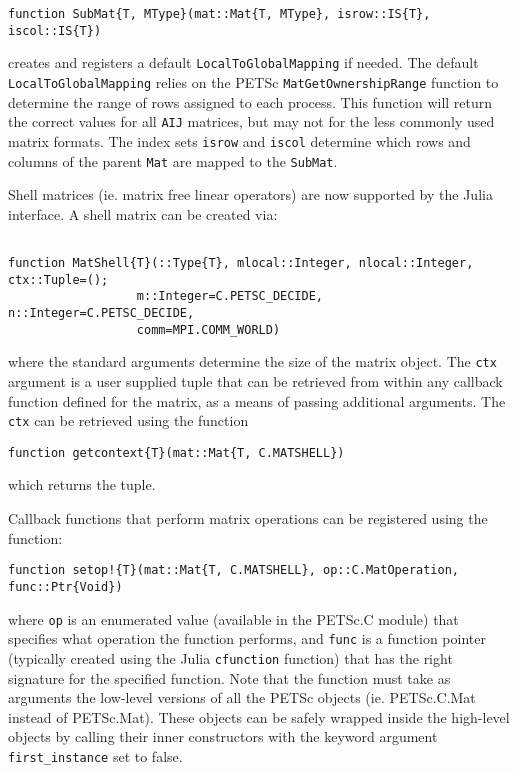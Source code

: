 \documentclass{article}
\begin{document}
\begin{verbatim}
function SubMat{T, MType}(mat::Mat{T, MType}, isrow::IS{T}, iscol::IS{T})
\end{verbatim}

\noindent creates and registers a default \texttt{LocalToGlobalMapping} if needed.  
The default \texttt{LocalToGlobalMapping} relies on the PETSc 
\texttt{MatGetOwnershipRange} function to determine the range of rows
assigned to each process.  This function will return the correct values for all 
\texttt{AIJ} matrices, but may not for the less commonly used matrix formats.
The index sets \texttt{isrow} and \texttt{iscol} determine which rows and
columns of the parent \texttt{Mat} are mapped to the \texttt{SubMat}.

Shell matrices (ie. matrix free linear operators) are now supported by the 
Julia interface.  A shell matrix can be created via:

\begin{verbatim}

function MatShell{T}(::Type{T}, mlocal::Integer, nlocal::Integer, ctx::Tuple=();
                  m::Integer=C.PETSC_DECIDE, n::Integer=C.PETSC_DECIDE, 
                  comm=MPI.COMM_WORLD)
\end{verbatim}

\noindent where the standard arguments determine the size of the matrix object.
The \texttt{ctx} argument is a user supplied tuple that can be retrieved from 
within any callback function defined for the matrix, as a means of passing
additional arguments.  The \texttt{ctx} can be retrieved using the function

\begin{verbatim}
function getcontext{T}(mat::Mat{T, C.MATSHELL})
\end{verbatim}

\noindent which returns the tuple.

Callback functions that perform matrix operations can be registered using 
the function:

\begin{verbatim}
function setop!{T}(mat::Mat{T, C.MATSHELL}, op::C.MatOperation, func::Ptr{Void})
\end{verbatim}

\noindent where \texttt{op} is an enumerated value (available in the PETSc.C module) that specifies what operation the function performs, and
\texttt{func} is a function pointer (typically created using the Julia \texttt{cfunction} function) that has the right signature for the specified function.
Note that the function must take as arguments the low-level versions of all the PETSc
objects (ie. PETSc.C.Mat instead of PETSc.Mat).  These objects can be safely
wrapped inside the high-level objects by calling their inner constructors with
the keyword argument \texttt{first\_instance} set to false.  
\end{document}
